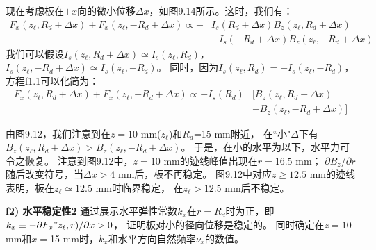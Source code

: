 现在考虑板在$+x$向的微小位移$\Delta x$，如图9.14所示。这时，我们有：
\begin{align*}%
F_{x}(z_{\ell},R_{d}+\Delta x)+F_{x}(z_{\ell},-R_{d}+\Delta x)\propto-&I_{s}(R_{d}+\Delta x)B_{z}(z_{\ell},R_{d}+\Delta x)\\
&+I_{s}(-R_{d}+\Delta x)B_{z}(z_{\ell},-R_{d}+\Delta x)\tag{f1.1}
\end{align*}
我们可以假设$I_{s}(z_{\ell},R_{d}+\Delta x)\simeq I_{s}(z_{\ell},R_{d})$，
$I_{s}(z_{\ell},-R_{d}+\Delta x)\simeq I_{s}(z_{\ell},-R_{d})$。
同时，因为$I_{s}(z_{\ell},R_{d})=-I_{s}(z_{\ell},-R_{d})$，方程f1.1可以化简为：
\begin{align*}%
F_{x}(z_{\ell},R_{d}+\Delta x)+F_{x}(z_{\ell},-R_{d}+\Delta x)\propto-I_{s}(R_{d})&[B_{z}(z_{\ell},R_{d}+\Delta x)\\
&-B_{z}(z_{\ell},-R_{d}+\Delta x)]\tag{f1.2}
\end{align*}

由图9.12，我们注意到在$z=10$ mm($z_\ell$)和$R_d$=15 mm附近，
在``小"$\Delta$下有$B_z(z_\ell,R_d+\Delta x)>B_z(z_\ell,-R_d+\Delta x)$。
于是，在小的水平为以下，水平力可令之恢复。
注意到图9.12中，$z=10$ mm的迹线峰值出现在$r=16.5$ mm；
$\partial B_z/\partial r$随后改变符号，当$\Delta x> 4$ mm后，板不再稳定。
图9.12中对应$z\ge 12.5$ mm的迹线表明，板在$z_\ell\simeq 12.5$ mm时临界稳定，
在$z_\ell> 12.5$ mm后不稳定。

\textbf{f2) 水平稳定性2}\qquad
通过展示水平弹性常数$k_x$在$r=R_d$时为正，即$k_x\equiv -\partial F_x"z_\ell,r)/\partial x>0$，
证明板对小的径向位移是稳定的。
同时确定在$z=10$ mm和$x=$15 mm时，$k_x$和水平方向自然频率$\nu_x$的数值。

